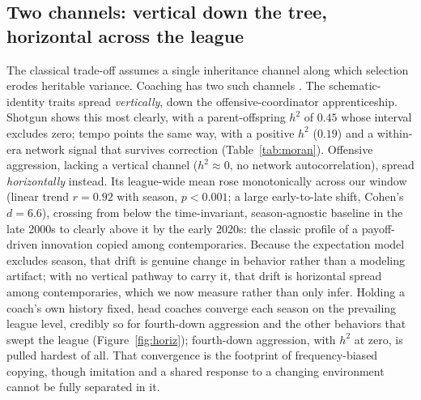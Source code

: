 \documentclass[
  journal=ehs,
  manuscript=article,
  year=2026,
  volume=8,
]{cup-journal}
\begin{document}
\subsection{Two channels: vertical down the tree, horizontal across the league}
The classical trade-off assumes a single inheritance channel along which selection
erodes heritable variance. Coaching has two such channels \parencite{cavallisforza1981,
boydricherson1985}. The schematic-identity traits spread \emph{vertically}, down the
offensive-coordinator apprenticeship. Shotgun shows this most clearly, with a
parent-offspring $h^{2}$ of $0.45$ whose interval excludes zero; tempo points the
same way, with a positive $h^{2}$ ($0.19$) and a within-era network signal that
survives correction (Table~\ref{tab:moran}). Offensive aggression, lacking a vertical channel
($h^{2}\approx0$, no network autocorrelation), spread \emph{horizontally} instead.
Its league-wide mean rose monotonically across our window (linear trend $r=0.92$ with
season, $p<0.001$; a large early-to-late shift, Cohen's $d=6.6$), crossing from below
the time-invariant, season-agnostic baseline in the late 2000s to clearly above it by
the early 2020s: the classic profile of a payoff-driven innovation copied among
contemporaries. Because the expectation model excludes season, that drift is genuine
change in behavior rather than a modeling artifact; with no vertical pathway to carry
it, that drift is horizontal spread among contemporaries, which we now measure rather
than only infer. Holding a coach's own history fixed, head coaches converge each
season on the prevailing league level, credibly so for fourth-down aggression and the
other behaviors that swept the league (Figure~\ref{fig:horiz}); fourth-down
aggression, with $h^{2}$ at zero, is pulled hardest of all. That convergence is the
footprint of frequency-biased copying, though imitation and a shared response to a
changing environment cannot be fully separated in it.
\end{document}
